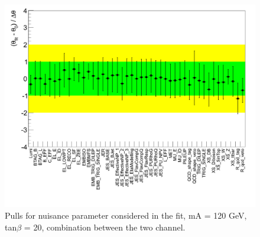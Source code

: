 \begin{figure}[htp]
     \begin{center}

            \includegraphics[width=\textwidth]{figure/np_check/NP_combined.png}
    \end{center}
    \caption{ Pulls for nuisance parameter considered in the fit,  mA = 120 GeV, tan$\beta$ = 20, combination between the two channel.} 
    \label{fig:np_pull_comb}
\end{figure}



